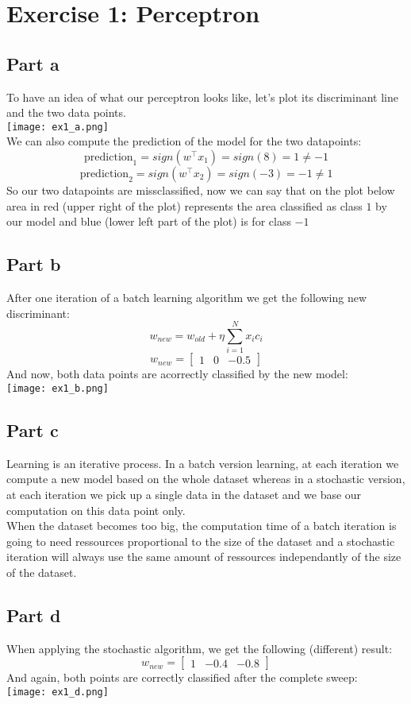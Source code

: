 \section{Exercise 1: Perceptron}
\subsection{Part a}
To have an idea of what our perceptron looks like, let's plot its discriminant line
and the two data points.
\\
\texttt{[image: ex1\_a.png]}
\\
We can also compute the prediction of the model for the two datapoints:
$$
\text{prediction}_1 = sign(w^\top x_1) = sign(8) = 1 \ne -1
$$
$$
\text{prediction}_2 = sign(w^\top x_2) = sign(-3) = -1 \ne 1
$$
So our two datapoints are missclassified, now we can say that on the plot below 
area in red (upper right of the plot) represents the area classified as class $1$ by our model and
blue (lower left part of the plot) is for class $-1$

\subsection{Part b}
After one iteration of a batch learning algorithm we get the following new discriminant:
$$
w_{new} = w_{old} + \eta\sum_{i=1}^N x_ic_i
$$
$$
w_{new} = \begin{bmatrix}1 & 0 & -0.5\end{bmatrix}
$$
And now, both data points are acorrectly classified by the new model:
\\
\texttt{[image: ex1\_b.png]}

\subsection{Part c}
Learning is an iterative process. In a batch version learning, at each iteration we compute a new model
based on the whole dataset whereas in a stochastic version, at each iteration we pick up a single data in the dataset
and we base our computation on this data point only.
\\
When the dataset becomes too big, the computation time of a batch iteration is going to need ressources 
proportional to the size of the dataset and a stochastic iteration will always use the same amount of ressources
independantly of the size of the dataset.

\subsection{Part d}
When applying the stochastic algorithm, we get the following (different) result:
$$
w_{new} = \begin{bmatrix}1 & -0.4 & -0.8\end{bmatrix}
$$
And again, both points are correctly classified after the complete sweep:
\\
\texttt{[image: ex1\_d.png]}


